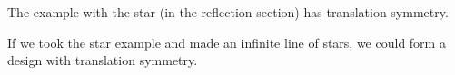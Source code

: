 \documentclass{ximera}
\begin{document}
\begin{question}
The example with the star (in the reflection section) has translation symmetry.
\begin{multipleChoice}
\end{multipleChoice}

If we took the star example and made  an infinite line of stars, we could form a design with translation symmetry.
\begin{multipleChoice}
\end{multipleChoice}
\end{question}
\end{document}
